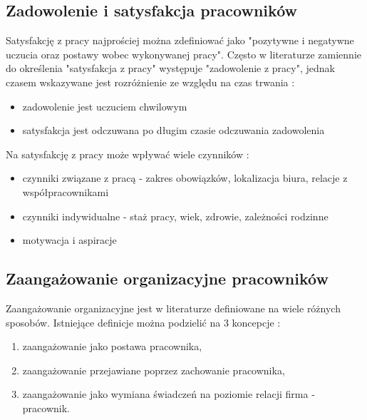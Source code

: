 
\subsection{Zadowolenie i satysfakcja pracowników}\label{sec:czynniki-wplywajace-na-fluktuacje:zadowolenie}
Satysfakcję z pracy najprościej można zdefiniować jako "pozytywne i negatywne uczucia oraz postawy wobec wykonywanej pracy"\cite{shultz-2002}.
Często w literaturze zamiennie do określenia "satysfakcja z pracy" występuje "zadowolenie z pracy", jednak czasem wskazywane jest rozróżnienie ze względu na czas trwania \cite{sowinska-2014}:
\begin{itemize}
    \item zadowolenie jest uczuciem chwilowym
    \item satysfakcja jest odczuwana po długim czasie odczuwania zadowolenia
\end{itemize}

Na satysfakcję z pracy może wpływać wiele czynników \cite{shultz-2002}:
\begin{itemize}
    \item czynniki związane z pracą - zakres obowiązków, lokalizacja biura, relacje z współpracownikami
    \item czynniki indywidualne - staż pracy, wiek, zdrowie, zależności rodzinne
    \item motywacja i aspiracje
\end{itemize}

\subsection{Zaangażowanie organizacyjne pracowników}\label{sec:czynniki-wplywajace-na-fluktuacje:zaangazowanie-organizacyjne}
Zaangażowanie organizacyjne jest w literaturze definiowane na wiele różnych sposobów.
Istniejące definicje można podzielić na 3 koncepcje \cite{juchnowicz-2010}:
\begin{enumerate}
    \item zaangażowanie jako postawa pracownika,
    \item zaangażowanie przejawiane poprzez zachowanie pracownika,
    \item zaangażowanie jako wymiana świadczeń na poziomie relacji firma - pracownik.
\end{enumerate}

